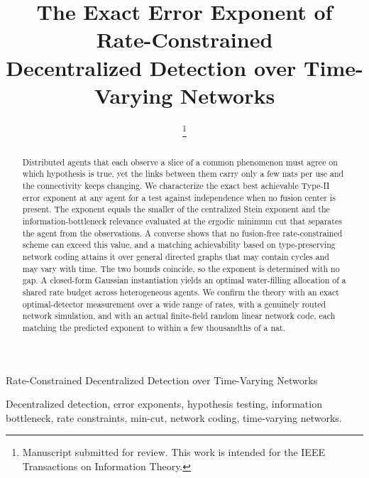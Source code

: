 \documentclass[journal]{IEEEtran}
\theoremstyle{definition}
\theoremstyle{remark}
\begin{document}
\title{The Exact Error Exponent of Rate-Constrained\\ Decentralized Detection over Time-Varying Networks}

\author{\thanks{Manuscript submitted for review. This work is intended for the IEEE Transactions on Information Theory.}}

%
{Rate-Constrained Decentralized Detection over Time-Varying Networks}

\maketitle

\begin{abstract}
Distributed agents that each observe a slice of a common phenomenon must agree on which hypothesis is true, yet
the links between them carry only a few nats per use and the connectivity keeps changing. We characterize the
exact best achievable Type-II error exponent at any agent for a test against independence when no fusion center
is present. The exponent equals the smaller of the centralized Stein exponent and the information-bottleneck
relevance evaluated at the ergodic minimum cut that separates the agent from the observations. A converse shows
that no fusion-free rate-constrained scheme can exceed this value, and a matching achievability based on
type-preserving network coding attains it over general directed graphs that may contain cycles and may vary with
time. The two bounds coincide, so the exponent is determined with no gap. A closed-form Gaussian instantiation
yields an optimal water-filling allocation of a shared rate budget across heterogeneous agents. We confirm the
theory with an exact optimal-detector measurement over a wide range of rates, with a genuinely routed network
simulation, and with an actual finite-field random linear network code, each matching the predicted exponent to
within a few thousandths of a nat.
\end{abstract}

\begin{IEEEkeywords}
Decentralized detection, error exponents, hypothesis testing, information bottleneck, rate constraints,
min-cut, network coding, time-varying networks.
\end{IEEEkeywords}

\end{document}
